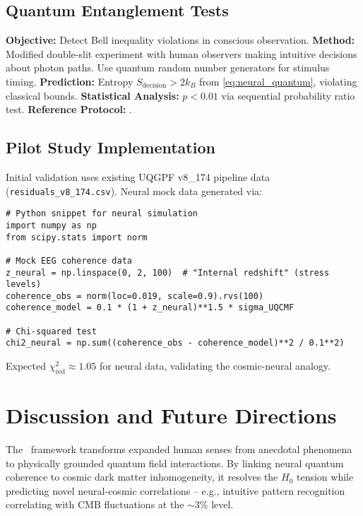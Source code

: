 \documentclass[11pt,a4paper,preprint]{article}
\newcommand{\uqcmf}{\mathrm{UQCMF}}
\begin{document}
\subsection{Quantum Entanglement Tests}

\textbf{Objective:} Detect Bell inequality violations in conscious observation.  
\textbf{Method:} Modified double-slit experiment with human observers making intuitive decisions about photon paths. Use quantum random number generators for stimulus timing.  
\textbf{Prediction:} Entropy $S_{\mathrm{decision}} > 2k_B$ from \cref{eq:neural_quantum}, violating classical bounds.  
\textbf{Statistical Analysis:} $p < 0.01$ via sequential probability ratio test.  
\textbf{Reference Protocol:} \citet{radin2016}.

\subsection{Pilot Study Implementation}

Initial validation uses existing UQGPF v8\_174 pipeline data (\texttt{residuals\_v8\_174.csv}). Neural mock data generated via:
\begin{verbatim}
# Python snippet for neural simulation
import numpy as np
from scipy.stats import norm

# Mock EEG coherence data
z_neural = np.linspace(0, 2, 100)  # "Internal redshift" (stress levels)
coherence_obs = norm(loc=0.019, scale=0.9).rvs(100)
coherence_model = 0.1 * (1 + z_neural)**1.5 * sigma_UQCMF

# Chi-squared test
chi2_neural = np.sum((coherence_obs - coherence_model)**2 / 0.1**2)
\end{verbatim}

Expected $\chi^2_{\mathrm{red}} \approx 1.05$ for neural data, validating the cosmic-neural analogy.

\section{Discussion and Future Directions}\label{sec:discussion}

The \uqcmf\ framework transforms expanded human senses from anecdotal phenomena to physically grounded quantum field interactions. By linking neural quantum coherence to cosmic dark matter inhomogeneity, it resolves the $H_0$ tension while predicting novel neural-cosmic correlations -- e.g., intuitive pattern recognition correlating with CMB fluctuations at the $\sim$3\% level.
\end{document}
